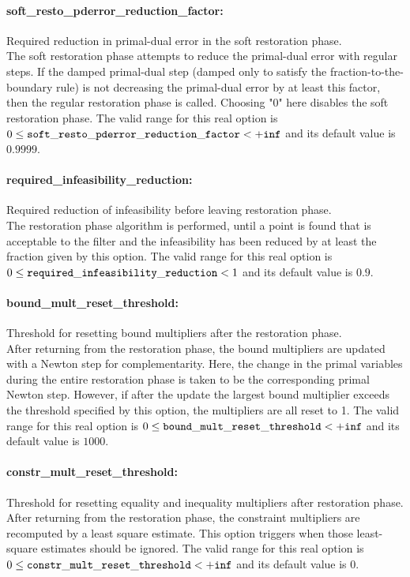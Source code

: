 \paragraph{soft\_resto\_pderror\_reduction\_factor:}\label{sec:soft_resto_pderror_reduction_factor} Required reduction in primal-dual error in the soft restoration phase. $\;$ \\
 The soft restoration phase attempts to reduce the
primal-dual error with regular steps. If the
damped primal-dual step (damped only to satisfy
the fraction-to-the-boundary rule) is not
decreasing the primal-dual error by at least this
factor, then the regular restoration phase is
called. Choosing "0" here disables the soft
restoration phase. The valid range for this real option is 
$0 \le {\tt soft\_resto\_pderror\_reduction\_factor } <  {\tt +inf}$
and its default value is $0.9999$.


\paragraph{required\_infeasibility\_reduction:}\label{sec:required_infeasibility_reduction} Required reduction of infeasibility before leaving restoration phase. $\;$ \\
 The restoration phase algorithm is performed,
until a point is found that is acceptable to the
filter and the infeasibility has been reduced by
at least the fraction given by this option. The valid range for this real option is 
$0 \le {\tt required\_infeasibility\_reduction } <  1$
and its default value is $0.9$.


\paragraph{bound\_mult\_reset\_threshold:}\label{sec:bound_mult_reset_threshold} Threshold for resetting bound multipliers after the restoration phase. $\;$ \\
 After returning from the restoration phase, the
bound multipliers are updated with a Newton step
for complementarity.  Here, the change in the
primal variables during the entire restoration
phase is taken to be the corresponding primal
Newton step. However, if after the update the
largest bound multiplier exceeds the threshold
specified by this option, the multipliers are all
reset to 1. The valid range for this real option is 
$0 \le {\tt bound\_mult\_reset\_threshold } <  {\tt +inf}$
and its default value is $1000$.


\paragraph{constr\_mult\_reset\_threshold:}\label{sec:constr_mult_reset_threshold} Threshold for resetting equality and inequality multipliers after restoration phase. $\;$ \\
 After returning from the restoration phase, the
constraint multipliers are recomputed by a least
square estimate.  This option triggers when those
least-square estimates should be ignored. The valid range for this real option is 
$0 \le {\tt constr\_mult\_reset\_threshold } <  {\tt +inf}$
and its default value is $0$.


